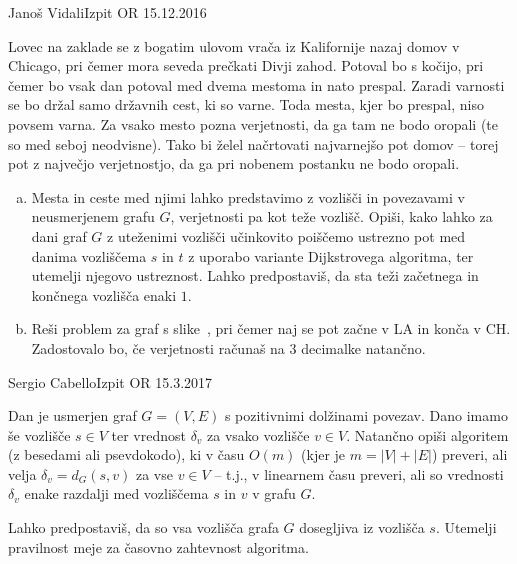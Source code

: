 \begin{naloga}{Janoš Vidali}{Izpit OR 15.12.2016}
\begin{vprasanje}[zaklad]
Lovec na zaklade se z bogatim ulovom
vrača iz Kalifornije nazaj domov v Chicago,
pri čemer mora seveda prečkati Divji zahod.
Potoval bo s kočijo,
pri čemer bo vsak dan potoval med dvema mestoma in nato prespal.
Zaradi varnosti se bo držal samo državnih cest, ki so varne.
Toda mesta, kjer bo prespal, niso povsem varna.
Za vsako mesto pozna verjetnosti,
da ga tam ne bodo oropali (te so med seboj neodvisne).
Tako bi želel načrtovati najvarnejšo pot domov
-- torej pot z največjo verjetnostjo,
da ga pri nobenem postanku ne bodo oropali.

\begin{enumerate}[(a)]
\item Mesta in ceste med njimi lahko predstavimo z vozlišči in povezavami
v ne\-usme\-rje\-nem grafu $G$, verjetnosti pa kot teže vozlišč.
Opiši, kako lahko za dani graf $G$ z uteženimi vozlišči
učinkovito poiščemo ustrezno pot med danima vozliščema $s$ in $t$
z uporabo variante Dijkstrovega algoritma,
ter utemelji njegovo ustreznost.
Lahko predpostaviš, da sta teži začetnega in končnega vozlišča enaki $1$.

\item Reši problem za graf s slike~\fig{},
pri čemer naj se pot začne v LA in konča v CH.
Zadostovalo bo, če verjetnosti računaš na $3$ decimalke natančno.
\end{enumerate}

\begin{slika}
\pgfslika
{}
\end{slika}
\end{vprasanje}
\begin{odgovor}
\end{odgovor}
\end{naloga}


\begin{naloga}{Sergio Cabello}{Izpit OR 15.3.2017}
\begin{vprasanje}
Dan je usmerjen graf $G = (V, E)$ s pozitivnimi dolžinami povezav.
Dano imamo še vozlišče $s \in V$
ter vrednost $\delta_v$ za vsako vozlišče $v \in V$.
Natančno opiši algoritem (z besedami ali psevdokodo),
ki v času $O(m)$ (kjer je $m = |V| + |E|$) preveri,
ali velja $\delta_v = d_G(s, v)$ za vse $v \in V$
-- t.j., v linearnem času preveri,
ali so vrednosti $\delta_v$
enake razdalji med vozliščema $s$ in $v$ v grafu $G$.

Lahko predpostaviš, da so vsa vozlišča grafa $G$ dosegljiva iz vozlišča $s$.
Utemelji pravilnost meje za časovno zahtevnost algoritma.
\end{vprasanje}
\begin{odgovor}
\end{odgovor}
\end{naloga}


